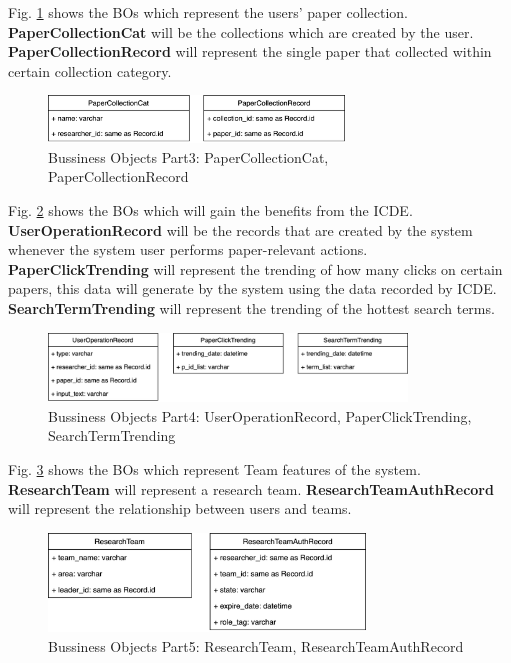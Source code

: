 Fig. \ref{fig:bo_classes_3} shows the BOs which represent the users' paper collection. 
\textbf{PaperCollectionCat} will be the collections which are created by the user.
\textbf{PaperCollectionRecord} will represent the single paper that collected within certain collection category.

\begin{figure}[t]
	\centering
	\includegraphics[width=0.7\textwidth]{./img/bo_classes_3.png}
	\caption{Bussiness Objects Part3: PaperCollectionCat, PaperCollectionRecord}
	
	\label{fig:bo_classes_3}
\end{figure}

Fig. \ref{fig:bo_classes_4} shows the BOs which will gain the benefits from the ICDE. 
\textbf{UserOperationRecord} will be the records that are created by the system whenever the system user performs paper-relevant actions.
\textbf{PaperClickTrending} will represent the trending of how many clicks on certain papers, 
this data will generate by the system using the data recorded by ICDE.
\textbf{SearchTermTrending} will represent the trending of the hottest search terms.

\begin{figure}[t]
	\centering
	\includegraphics[width=0.85\textwidth]{./img/bo_classes_4.png}
	\caption{Bussiness Objects Part4: UserOperationRecord, PaperClickTrending, SearchTermTrending}
	
	\label{fig:bo_classes_4}
\end{figure}


Fig. \ref{fig:bo_classes_5} shows the BOs which represent Team features of the system. 
\textbf{ResearchTeam} will represent a research team.
\textbf{ResearchTeamAuthRecord} will represent the relationship between users and teams.

\begin{figure}[t]
	\centering
	\includegraphics[width=0.75\textwidth]{./img/bo_classes_5.png}
	\caption{Bussiness Objects Part5: ResearchTeam, ResearchTeamAuthRecord}
	
	\label{fig:bo_classes_5}
\end{figure}


